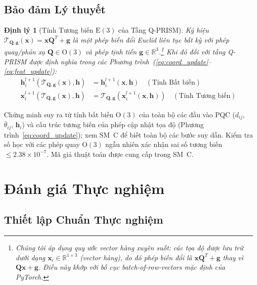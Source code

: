 \documentclass[10pt,twocolumn,letterpaper]{article}
\newtheorem{theorem}{Định lý}
\begin{document}
\subsection{Bảo đảm Lý thuyết}
\label{sec:theory}

\begin{theorem}[Tính Tương biến $\mathrm{E}(3)$ của Tầng Q-PRISM]
\label{thm:equivariance}
Ký hiệu $\mathcal{T}_{\mathbf{Q}, \mathbf{g}}(\mathbf{x}) = \mathbf{x} \mathbf{Q}^T + \mathbf{g}$ là một phép biến đổi Euclid liên tục bất kỳ với phép quay/phản xạ $\mathbf{Q} \in \mathrm{O}(3)$ và phép tịnh tiến $\mathbf{g} \in \mathbb{R}^3$.\footnote{Chúng tôi áp dụng quy ước vector hàng xuyên suốt: các tọa độ được lưu trữ dưới dạng $\mathbf{x}_i \in \mathbb{R}^{1 \times 3}$ (vector hàng), do đó phép biến đổi là $\mathbf{x} \mathbf{Q}^T + \mathbf{g}$ thay vì $\mathbf{Q}\mathbf{x} + \mathbf{g}$. Điều này khớp với bố cục batch-of-row-vectors mặc định của PyTorch.} Khi đó đối với tầng Q-PRISM được định nghĩa trong các Phương trình~(\ref{eq:coord_update}--\ref{eq:feat_update}):
\begin{align}
    \mathbf{h}_i^{l+1}(\mathcal{T}_{\mathbf{Q}, \mathbf{g}}(\mathbf{x}), \mathbf{h}) &= \mathbf{h}_i^{l+1}(\mathbf{x}, \mathbf{h}) \quad (\text{Tính Bất biến}) \\
    \mathbf{x}_i^{l+1}(\mathcal{T}_{\mathbf{Q}, \mathbf{g}}(\mathbf{x}), \mathbf{h}) &= \mathcal{T}_{\mathbf{Q}, \mathbf{g}}(\mathbf{x}_i^{l+1}(\mathbf{x}, \mathbf{h})) \quad (\text{Tính Tương biến})
\end{align}
\end{theorem}

Chứng minh suy ra từ tính bất biến $\mathrm{O}(3)$ của toàn bộ các đầu vào PQC ($d_{ij}$, $\bar{\theta}_{ij}$, $\mathbf{h}_i$) và cấu trúc tương biến của phép cập nhật tọa độ (Phương trình~\ref{eq:coord_update}); xem SM~C để biết toàn bộ các bước suy dẫn. Kiểm tra số học với các phép quay $\mathrm{O}(3)$ ngẫu nhiên xác nhận sai số tương biến $\le 2.38 \times 10^{-7}$. Mã giả thuật toán được cung cấp trong SM~C.

\section{Đánh giá Thực nghiệm}
\label{sec:experiments}

\subsection{Thiết lập Chuẩn Thực nghiệm}
\end{document}
